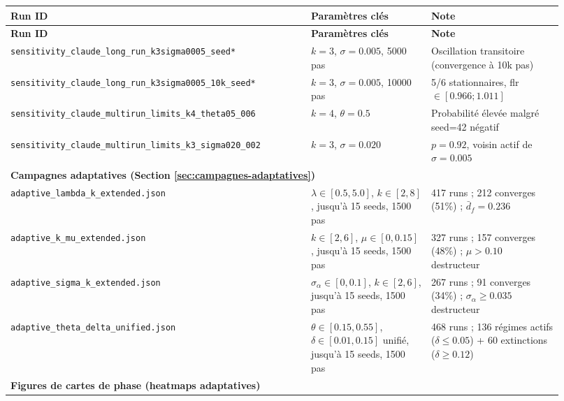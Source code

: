 \begin{longtable}{p{0.50\linewidth}p{0.20\linewidth}p{0.22\linewidth}}
\hline
\textbf{Run ID} & \textbf{Paramètres clés} & \textbf{Note} \\
\hline
\endfirsthead
\hline
\textbf{Run ID} & \textbf{Paramètres clés} & \textbf{Note} \\
\hline
\endhead
\hline
\endfoot

\texttt{sensitivity\_claude\_long\_run\_k3sigma0005\_seed*}
 & $k=3$, $\sigma=0.005$, 5000 pas & Oscillation transitoire (convergence à 10k pas) \\

\texttt{sensitivity\_claude\_long\_run\_k3sigma0005\_10k\_seed*}
 & $k=3$, $\sigma=0.005$, 10000 pas & 5/6 stationnaires, flr $\in [0.966;1.011]$ \\

\texttt{sensitivity\_claude\_multirun\_limits\_k4\_theta05\_006}
 & $k=4$, $\theta=0.5$ & Probabilité élevée malgré seed=42 négatif \\

\texttt{sensitivity\_claude\_multirun\_limits\_k3\_sigma020\_002}
 & $k=3$, $\sigma=0.020$ & $p=0.92$, voisin actif de $\sigma=0.005$ \\

\hline
\multicolumn{3}{|l|}{\textbf{Campagnes adaptatives (Section \ref{sec:campagnes-adaptatives})}} \\
\hline

\texttt{adaptive\_lambda\_k\_extended.json}
 & $\lambda \in [0.5,5.0]$, $k \in [2,8]$, jusqu'à 15 seeds, 1500 pas
 & 417 runs ; 212 converges (51\%) ; $\bar{d}_f=0.236$ \\

\texttt{adaptive\_k\_mu\_extended.json}
 & $k \in [2,6]$, $\mu \in [0,0.15]$, jusqu'à 15 seeds, 1500 pas
 & 327 runs ; 157 converges (48\%) ; $\mu>0.10$ destructeur \\

\texttt{adaptive\_sigma\_k\_extended.json}
 & $\sigma_\alpha \in [0,0.1]$, $k \in [2,6]$, jusqu'à 15 seeds, 1500 pas
 & 267 runs ; 91 converges (34\%) ; $\sigma_\alpha\ge0.035$ destructeur \\

\texttt{adaptive\_theta\_delta\_unified.json}
 & $\theta \in [0.15,0.55]$, $\delta \in [0.01,0.15]$ unifié, jusqu'à 15 seeds, 1500 pas
 & 468 runs ; 136 régimes actifs ($\delta\le0.05$) + 60 extinctions ($\delta\ge0.12$) \\

\hline
\multicolumn{3}{|l|}{\textbf{Figures de cartes de phase (heatmaps adaptatives)}} \\
\hline


\end{longtable}
